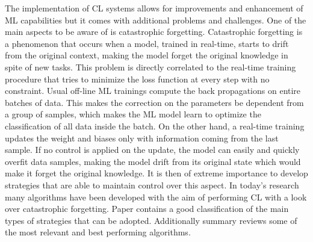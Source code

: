 \documentclass[12pt]{report}
\begin{document}
The implementation of CL systems allows for improvements and enhancement of ML capabilities but it comes with additional problems and challenges. One of the main aspects to be aware of is catastrophic forgetting. Catastrophic forgetting \cite{french1999catastrophic} is a phenomenon that occurs when a model, trained in real-time, starts to drift from the original context, making the model forget the original knowledge in spite of new tasks. This problem is directly correlated to the real-time training procedure that tries to minimize the loss function at every step with no constraint. Usual off-line ML trainings compute the back propagations on entire batches of data. This makes the correction on the parameters be dependent from a group of samples, which makes the ML model learn to optimize the classification of all data inside the batch. On the other hand, a real-time training updates the weight and biases only with information coming from the last sample. If no control is applied on the update, the model can easily and quickly overfit data samples, making the model drift from its original state which would make it forget the original knowledge. It is then of extreme importance to develop strategies that are able to maintain control over this aspect. In today's research many algorithms have been developed with the aim of performing CL with a look over catastrophic forgetting. Paper \cite{maltoni2019continuous} contains a good classification of the main types of strategies that can be adopted. Additionally summary \cite{lesort2020continual} reviews some of the most relevant and best performing algorithms. \\
\end{document}
